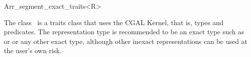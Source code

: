 
\ccRefPageBegin


\begin{ccRefClass}{Arr_segment_exact_traits<R>}

\ccDefinition
   The class \ccRefName\ is
   a traits class that uses the CGAL Kernel, that is, types and predicates.
   The representation type  is recommended to be an
   exact type such as  or
    or any other
   exact type, although other inexact representations can be used at
   the user's own risk.


\ccIsModel
     


\end{ccRefClass} %

\ccRefPageEnd
